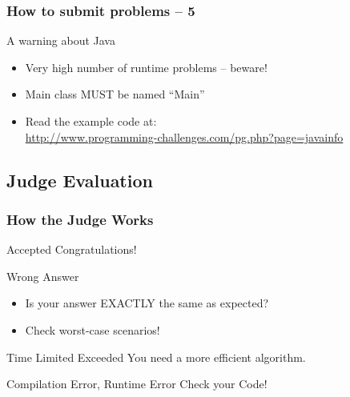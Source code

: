 \documentclass{beamer}
\begin{document}
\begin{frame}
  \frametitle{How to submit problems -- 5}
  \begin{block}{A warning about Java}
    \begin{itemize}
    \item Very high number of runtime problems -- beware!
      \medskip

    \item Main class MUST be named ``Main''
      \medskip

    \item Read the example code at:\\
      \url{http://www.programming-challenges.com/pg.php?page=javainfo}
    \end{itemize}
  \end{block}
\end{frame}

\subsection{Judge Evaluation}

\begin{frame}
  \frametitle{How the Judge Works}
  \begin{block}{Accepted}
    Congratulations!
  \end{block}
  \begin{block}{\alert{Wrong Answer}}
    \begin{itemize}
    \item Is your answer EXACTLY the same as expected?
    \item Check worst-case scenarios!
    \end{itemize}
  \end{block}
  \begin{block}{\alert{Time Limited Exceeded}}
    You need a more efficient algorithm.
  \end{block}
  \begin{block}{Compilation Error, Runtime Error}
    Check your Code!
  \end{block}
\end{frame}
\end{document}
